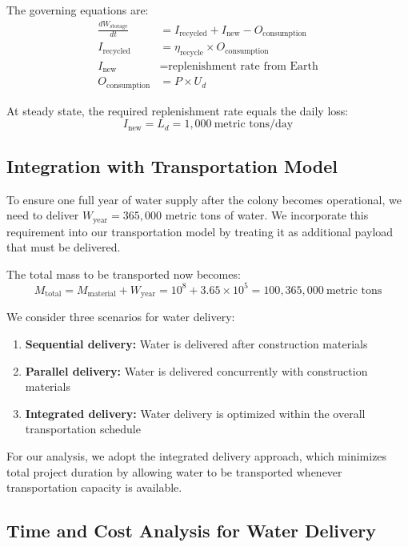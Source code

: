 \documentclass{mcmthesis}
\begin{document}
The governing equations are:
\begin{align*}
    \frac{dW_{\text{storage}}}{dt} & = I_{\text{recycled}} + I_{\text{new}} - O_{\text{consumption}} \\
    I_{\text{recycled}}            & = \eta_{\text{recycle}} \times O_{\text{consumption}}           \\
    I_{\text{new}}                 & = \text{replenishment rate from Earth}                          \\
    O_{\text{consumption}}         & = P \times U_d
\end{align*}

At steady state, the required replenishment rate equals the daily loss:
\[
    I_{\text{new}} = L_d = 1,000\ \text{metric tons/day}
\]

\subsection{Integration with Transportation Model}

To ensure one full year of water supply after the colony becomes operational, we need to deliver $W_{\text{year}} = 365,000$ metric tons of water. We incorporate this requirement into our transportation model by treating it as additional payload that must be delivered.

The total mass to be transported now becomes:
\[
    M_{\text{total}} = M_{\text{material}} + W_{\text{year}} = 10^8 + 3.65 \times 10^5 = 100,365,000\ \text{metric tons}
\]

We consider three scenarios for water delivery:

\begin{enumerate}
    \item \textbf{Sequential delivery:} Water is delivered after construction materials
    \item \textbf{Parallel delivery:} Water is delivered concurrently with construction materials
    \item \textbf{Integrated delivery:} Water delivery is optimized within the overall transportation schedule
\end{enumerate}

For our analysis, we adopt the integrated delivery approach, which minimizes total project duration by allowing water to be transported whenever transportation capacity is available.

\subsection{Time and Cost Analysis for Water Delivery}
\end{document}
